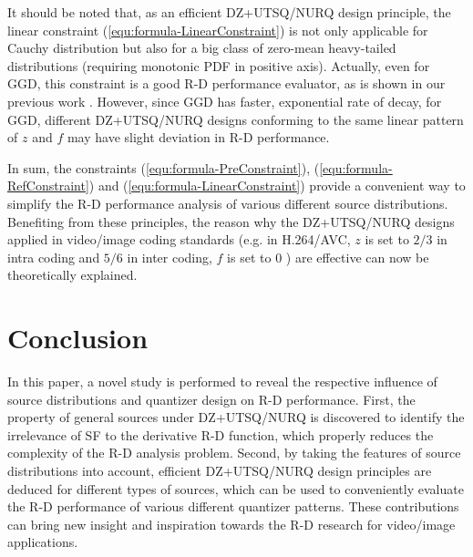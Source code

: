 \documentclass[smallabstract,smallcaptions]{dccpaper}
\begin{document}
It should be noted that, as an efficient DZ+UTSQ/NURQ design principle, the linear constraint (\ref{equ:formula-LinearConstraint}) is not only applicable for Cauchy distribution but also for a big class of zero-mean heavy-tailed distributions (requiring monotonic PDF in positive axis). Actually, even for GGD, this constraint is a good R-D performance evaluator, as is shown in our previous work \cite{Sun_TIP2013}. However, since GGD has faster, exponential rate of decay, for GGD, different DZ+UTSQ/NURQ designs conforming to the same linear pattern of $z$ and $f$ may have slight deviation in R-D performance. 

In sum, the constraints (\ref{equ:formula-PreConstraint}), (\ref{equ:formula-RefConstraint}) and (\ref{equ:formula-LinearConstraint}) provide a convenient way to simplify the R-D performance analysis of various different source distributions. Benefiting from these principles, the reason why the DZ+UTSQ/NURQ designs applied in video/image coding standards (e.g. in H.264/AVC, $z$ is set to $2/3$ in intra coding and $5/6$ in inter coding, $f$ is set to $0$ \cite{Sullivan_VCIP2005}) are effective can now be theoretically explained.

\section{Conclusion}

In this paper, a novel study is performed to reveal the respective influence of source distributions and quantizer design on R-D performance. First, the property of general sources under DZ+UTSQ/NURQ is discovered to identify the irrelevance of SF to the derivative R-D function, which properly reduces the complexity of the R-D analysis problem. Second, by taking the features of source distributions into account, efficient DZ+UTSQ/NURQ design principles are deduced for different types of sources, which can be used to conveniently evaluate the R-D performance of various different quantizer patterns. These contributions can bring new insight and inspiration towards the R-D research for video/image applications.

\end{document}
